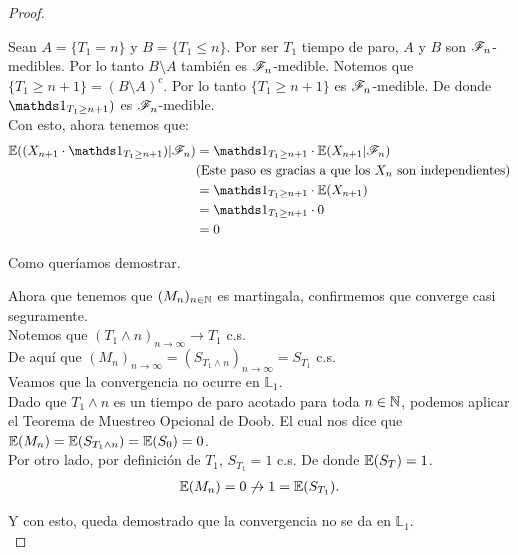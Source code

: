 \begin{proof}
\begin{itemize}
					Sean $A = \{T_1 = n\}$ y $B = \{ T_1 \leq n\}$. Por ser $T_1$ tiempo de paro,
					$A$ y $B$ son $\mathscr{F}_n$-medibles. Por lo tanto $B \setminus A$ también es $\mathscr{F}_n$-medible. 
					Notemos que $\{T_1 \geq n+1\} = (B \setminus A)^c$. Por lo tanto $\{T_1 \geq n+1\}$ es
					$\mathscr{F}_n$-medible. De donde  $\indic_{T_1 \geq n+1})$ es $\mathscr{F}_n$-medible.\\
					
					Con esto, ahora tenemos que:
					\begin{align}
						\E((X_{n+1} \cdot \indic_{T_1 \geq n+1}) | \F_{n}) &= \indic_{T_1 \geq n+1} \cdot \E(X_{n+1} | \F_{n}) \\
						&\mbox{(Este paso es gracias a que los $X_n$ son independientes)} \\
						&=\indic_{T_1 \geq n+1} \cdot \E(X_{n+1} ) \\
						&=\indic_{T_1 \geq n+1} \cdot 0 \\
						&= 0
					\end{align}	
					
					Como queríamos demostrar.
			\end{itemize}
			
			Ahora que tenemos que $(M_n)_{n \in \mathbb{N}}$ es martingala, confirmemos que converge casi seguramente.\\
			
			Notemos que $(T_1 \wedge n)_{n \rightarrow \infty} \rightarrow T_1$ c.s.\\
			
			De aquí que $(M_n)_{n \rightarrow \infty} = (S_{T_1 \wedge n})_{n \rightarrow \infty} = S_{T_1}$ c.s. \\				
			
			Veamos que la convergencia no ocurre en $\mathbb{L}_1$. \\
						
			Dado que $T_1 \wedge n$ es un tiempo de paro acotado para toda $n \in \mathbb{N}$,
			podemos aplicar el Teorema de Muestreo Opcional de 	Doob. 
			El cual nos dice que $\mathbb{E}(M_n) = \mathbb{E}(S_{T_1 \wedge n}) = \mathbb{E}(S_0) = 0$.\\
			
			Por otro lado, por definición de $T_1$, $S_{T_1} = 1$ c.s.	De donde $\mathbb{E}(S_T) = 1$.\\
			
			\begin{align}
				\mathbb{E}(M_n) = 0 \not\rightarrow 1 = \mathbb{E}(S_{T_1}).
			\end{align}			
			
			Y con esto, queda demostrado que la convergencia no se da en $\mathbb{L}_1$.\\
			

\end{proof}
